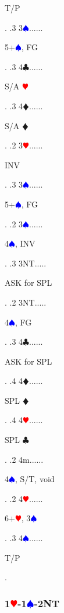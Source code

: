 \documentclass[a4paper]{article}
\newcommand{\BC}{\textcolor{OliveGreen}{$\clubsuit$}}
\newcommand{\BD}{\textcolor{RedOrange}{$\vardiamondsuit$}}
\newcommand{\BH}{\textcolor{Red}{$\varheartsuit${}}}
\newcommand{\BS}{\textcolor{Blue}{$\spadesuit${}}}
\newcommand{\pdfh}{\texorpdfstring{\BH{}}{H}}
\newcommand{\pdfs}{\texorpdfstring{\BS{}}{S}}
\begin{document}
{\begin{minipage}[t]{0.8\textwidth}
T/P
\end{minipage}. 
 .3 3\BS......\begin{minipage}[t]{0.8\textwidth}
5+\BS , FG
\end{minipage}. 
 .3 4\BC......\begin{minipage}[t]{0.8\textwidth}
S/A \BH 
\end{minipage}. 
 .3 4\BD......\begin{minipage}[t]{0.8\textwidth}
S/A \BD 
\end{minipage}. 
 .2 3\BH......\begin{minipage}[t]{0.8\textwidth}
INV
\end{minipage}. 
 .3 3\BS......\begin{minipage}[t]{0.8\textwidth}
5+\BS , FG
\end{minipage}. 
 .2 3\BS......\begin{minipage}[t]{0.8\textwidth}
4\BS , INV
\end{minipage}. 
 .3 3NT.....\begin{minipage}[t]{0.8\textwidth}
ASK for SPL
\end{minipage}. 
 .2 3NT.....\begin{minipage}[t]{0.8\textwidth}
4\BS , FG
\end{minipage}. 
 .3 4\BC......\begin{minipage}[t]{0.8\textwidth}
ASK for SPL
\end{minipage}. 
 .4 4\BD......\begin{minipage}[t]{0.8\textwidth}
SPL \BD 
\end{minipage}. 
 .4 4\BH......\begin{minipage}[t]{0.8\textwidth}
SPL \BC 
\end{minipage}. 
 .2 4m......\begin{minipage}[t]{0.8\textwidth}
4\BS , S/T, void
\end{minipage}. 
 .2 4\BH......\begin{minipage}[t]{0.8\textwidth}
6+\BH , 3\BS 
\end{minipage}. 
 .3 4\BS......\begin{minipage}[t]{0.8\textwidth}
T/P
\end{minipage}. 
}
\bigbreak
\subsubsection{1\pdfh-1\pdfs-2NT}
\end{document}
